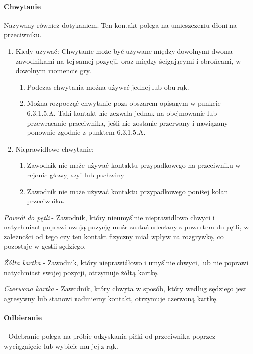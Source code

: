 \documentclass[12pt]{article}
\begin{document}
\paragraph{Chwytanie}
Nazywany również dotykaniem. Ten kontakt
polega na umieszczeniu dłoni na przeciwniku.

\begin{enumerate}
	\item
	      Kiedy używać: Chwytanie może być używane między dowolnymi dwoma
	      zawodnikami na tej samej pozycji, oraz między ścigającymi i obrońcami,
	      w dowolnym momencie gry.

	      \begin{enumerate}
		      \item
		            Podczas chwytania można używać jednej lub obu rąk.
		      \item
		            Można rozpocząć chwytanie poza obszarem opisanym w punkcie
		            6.3.1.5.A. Taki kontakt nie zezwala jednak na obejmowanie lub
		            przewracanie przeciwnika, jeśli nie zostanie przerwany i nawiązany
		            ponownie zgodnie z punktem 6.3.1.5.A.
	      \end{enumerate}
	\item
	      Nieprawidłowe chwytanie:

	      \begin{enumerate}
		      \item
		            Zawodnik nie może używać kontaktu przypadkowego na przeciwniku w
		            rejonie głowy, szyi lub pachwiny.
		      \item
		            Zawodnik nie może używać kontaktu przypadkowego poniżej kolan
		            przeciwnika.
	      \end{enumerate}
\end{enumerate}

\emph{Powrót do pętli} - Zawodnik, który nieumyślnie nieprawidłowo
chwyci i natychmiast poprawi swoją pozycję może zostać odesłany z
powrotem do pętli, w zależności od tego czy ten kontakt fizyczny miał
wpływ na rozgrywkę, co pozostaje w gestii sędziego.

\emph{Żółta kartka} - Zawodnik, który nieprawidłowo i umyślnie chwyci,
lub nie poprawi natychmiast swojej pozycji, otrzymuje żółtą kartkę.

\emph{Czerwona kartka} - Zawodnik, który chwyta w sposób, który według
sędziego jest agresywny lub stanowi nadmierny kontakt, otrzymuje
czerwoną kartkę.

\paragraph{Odbieranie} - Odebranie polega na próbie odzyskania
piłki od przeciwnika poprzez wyciągnięcie lub wybicie mu jej z rąk.
\end{document}
